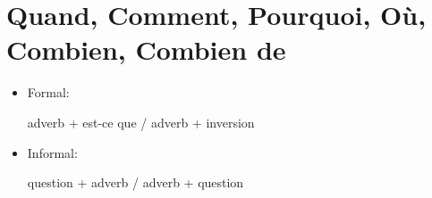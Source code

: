 \documentclass{book}
\begin{document}
    \section{Quand, Comment, Pourquoi, Où, Combien, Combien de}
        \begin{itemize}
            \item Formal: 
                \begin{center}
                    adverb + est-ce que / adverb + inversion
                \end{center}

            \item Informal: 
                \begin{center}
                    question + adverb / adverb + question
                \end{center}
            

\end{itemize}
\end{document}
